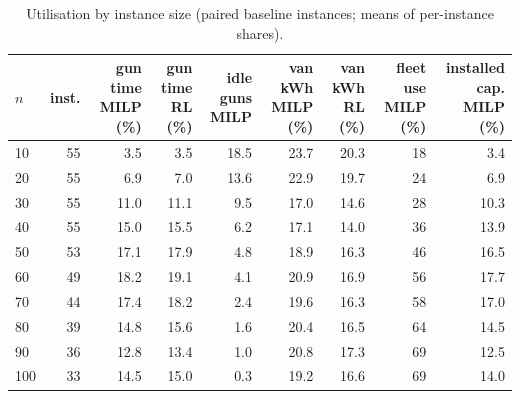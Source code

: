 \begin{table}[H]\centering
\small
\caption{Utilisation by instance size (paired baseline instances; means of per-instance shares).}\label{tab:utiln}
\begin{adjustbox}{max width=\textwidth}\begin{tabular}{lrrrrrrrr}\toprule
$n$ & inst. & \shortstack{gun time\\MILP (\%)} & \shortstack{gun time\\RL (\%)} & \shortstack{idle guns\\MILP} & \shortstack{van kWh\\MILP (\%)} & \shortstack{van kWh\\RL (\%)} & \shortstack{fleet use\\MILP (\%)} & \shortstack{installed cap.\\MILP (\%)} \\ \midrule
10 & 55 & 3.5 & 3.5 & 18.5 & 23.7 & 20.3 & 18 & 3.4 \\
20 & 55 & 6.9 & 7.0 & 13.6 & 22.9 & 19.7 & 24 & 6.9 \\
30 & 55 & 11.0 & 11.1 & 9.5 & 17.0 & 14.6 & 28 & 10.3 \\
40 & 55 & 15.0 & 15.5 & 6.2 & 17.1 & 14.0 & 36 & 13.9 \\
50 & 53 & 17.1 & 17.9 & 4.8 & 18.9 & 16.3 & 46 & 16.5 \\
60 & 49 & 18.2 & 19.1 & 4.1 & 20.9 & 16.9 & 56 & 17.7 \\
70 & 44 & 17.4 & 18.2 & 2.4 & 19.6 & 16.3 & 58 & 17.0 \\
80 & 39 & 14.8 & 15.6 & 1.6 & 20.4 & 16.5 & 64 & 14.5 \\
90 & 36 & 12.8 & 13.4 & 1.0 & 20.8 & 17.3 & 69 & 12.5 \\
100 & 33 & 14.5 & 15.0 & 0.3 & 19.2 & 16.6 & 69 & 14.0 \\
\bottomrule\end{tabular}\end{adjustbox}\end{table}
